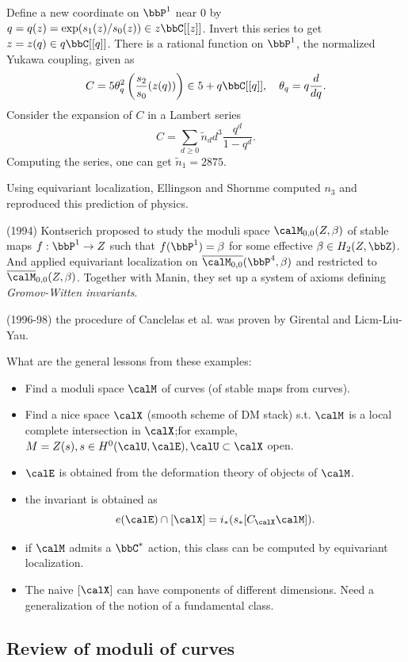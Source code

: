     Define a new coordinate on \(\bbP^1\) near \(0\) by \(q = q(z) = \exp(s_1(z)/s_0(z)) \in z\bbC[[z]]\).
    Invert this series to get \(z = z(q) \in q \bbC[[q]]\).
    There is a rational function on $\bbP^1$, the normalized Yukawa coupling, given as
    \[ C = 5 \theta_q^2\left( \frac{s_2}{s_0}(z(q)) \right) \in 5 + q \bbC[[q]], \quad \theta_q = q \frac{d}{dq}. \]
    Consider the expansion of \(C\) in a Lambert series
    \[ C = \sum_{d \geq 0} \tilde{n}_d d^3 \frac{q^d}{1-q^d}. \]
    Computing the series, one can get \(\tilde{n}_1 = 2875\).

    Using equivariant localization, Ellingson and Shornme computed \(n_3\) and reproduced this prediction of physics.

    (1994) Kontserich proposed to study the moduli space $\calM_{0,0}(Z,\beta)$ of stable maps \(f:\bbP^1 \to Z\) such that \(f(\bbP^1) = \beta\) for some effective \(\beta \in H_2(Z,\bbZ)\).
    And applied equivariant localization on $\overline{\calM_{0,0}}(\bbP^4, \beta)$ and restricted to $\overline{\calM}_{0,0}(Z,\beta)$.
    Together with Manin, they set up a system of axioms defining \emph{Gromov-Witten invariants}.

    (1996-98) the procedure of Canclelas et al. was proven by Girental and Licm-Liu-Yau.

    What are the general lessons from these examples:
    \begin{itemize}
        \item Find a moduli space \(\calM\) of curves (of stable maps from curves).
        \item Find a nice space \(\calX\) (smooth scheme of DM stack) s.t. $\calM$ is a local complete intersection in $\calX$;for example, $M=Z(s), s \in H^0(\calU,\calE), \calU \subset \calX$ open.
        \item \(\calE\) is obtained from the deformation theory of objects of \(\calM\).
        \item the invariant is obtained as 
            \[ e(\calE) \cap [\calX] = i_*(s_*[C_\calX \calM]). \]
        \item if \(\calM\) admits a \(\bbC^*\) action, this class can be computed by equivariant localization.
        \item The naive $[\calX]$ can have components of different dimensions. Need a generalization of the notion of a fundamental class.
    \end{itemize}


\subsection{Review of moduli of curves}

